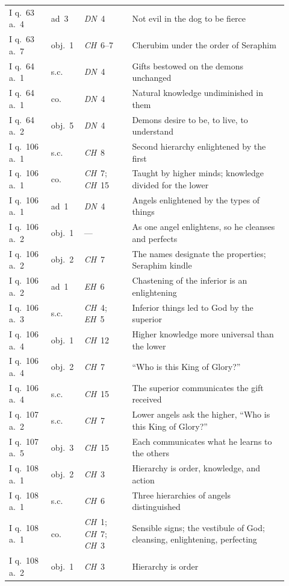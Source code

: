 {\begin{longtable}{@{}>{\raggedright\arraybackslash}p{0.14\linewidth}>{\raggedright\arraybackslash}p{0.10\linewidth}>{\raggedright\arraybackslash}p{0.16\linewidth}>{\raggedright\arraybackslash}p{0.52\linewidth}@{}}
I q.~63 a.~4 & ad~3 & \emph{DN}~4 & Not evil in the dog to be fierce \\
I q.~63 a.~7 & obj.~1 & \emph{CH}~6--7 & Cherubim under the order of Seraphim \\
I q.~64 a.~1 & s.c. & \emph{DN}~4 & Gifts bestowed on the demons unchanged \\
I q.~64 a.~1 & co. & \emph{DN}~4 & Natural knowledge undiminished in them \\
I q.~64 a.~2 & obj.~5 & \emph{DN}~4 & Demons desire to be, to live, to understand \\
I q.~106 a.~1 & s.c. & \emph{CH}~8 & Second hierarchy enlightened by the first \\
I q.~106 a.~1 & co. & \emph{CH}~7; \emph{CH}~15 & Taught by higher minds; knowledge divided for the lower \\
I q.~106 a.~1 & ad~1 & \emph{DN}~4 & Angels enlightened by the types of things \\
I q.~106 a.~2 & obj.~1 & --- & As one angel enlightens, so he cleanses and perfects \\
I q.~106 a.~2 & obj.~2 & \emph{CH}~7 & The names designate the properties; Seraphim kindle \\
I q.~106 a.~2 & ad~1 & \emph{EH}~6 & Chastening of the inferior is an enlightening \\
I q.~106 a.~3 & s.c. & \emph{CH}~4; \emph{EH}~5 & Inferior things led to God by the superior \\
I q.~106 a.~4 & obj.~1 & \emph{CH}~12 & Higher knowledge more universal than the lower \\
I q.~106 a.~4 & obj.~2 & \emph{CH}~7 & ``Who is this King of Glory?'' \\
I q.~106 a.~4 & s.c. & \emph{CH}~15 & The superior communicates the gift received \\
I q.~107 a.~2 & s.c. & \emph{CH}~7 & Lower angels ask the higher, ``Who is this King of Glory?'' \\
I q.~107 a.~5 & obj.~3 & \emph{CH}~15 & Each communicates what he learns to the others \\
I q.~108 a.~1 & obj.~2 & \emph{CH}~3 & Hierarchy is order, knowledge, and action \\
I q.~108 a.~1 & s.c. & \emph{CH}~6 & Three hierarchies of angels distinguished \\
I q.~108 a.~1 & co. & \emph{CH}~1; \emph{CH}~7; \emph{CH}~3 & Sensible signs; the vestibule of God; cleansing, enlightening, perfecting \\
I q.~108 a.~2 & obj.~1 & \emph{CH}~3 & Hierarchy is order \\

\end{longtable}}
